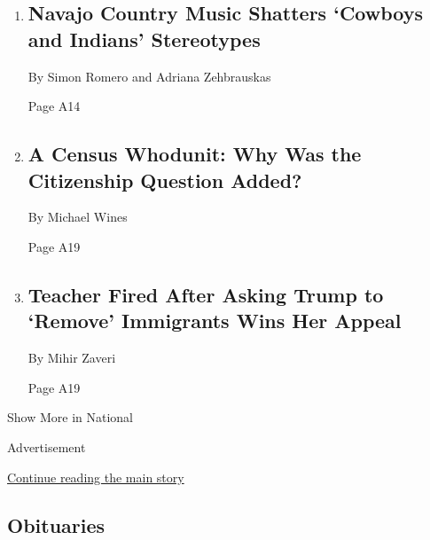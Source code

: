 \begin{enumerate}
\def\labelenumi{\arabic{enumi}.}
\item
  \href{/2019/11/30/us/navajo-country-music.html}{}

  \hypertarget{navajo-country-music-shatters-cowboys-and-indians-stereotypes-1}{%
  \subsection{Navajo Country Music Shatters `Cowboys and Indians'
  Stereotypes}\label{navajo-country-music-shatters-cowboys-and-indians-stereotypes-1}}

  By Simon Romero and Adriana Zehbrauskas

  Page A14
\item
  \href{/2019/11/30/us/census-citizenship-question-hofeller.html}{}

  \hypertarget{a-census-whodunit-why-was-the-citizenship-question-added}{%
  \subsection{A Census Whodunit: Why Was the Citizenship Question
  Added?}\label{a-census-whodunit-why-was-the-citizenship-question-added}}

  By Michael Wines

  Page A19
\item
  \href{/2019/11/29/us/teacher-trump-tweets-reinstated.html}{}

  \hypertarget{teacher-fired-after-asking-trump-to-remove-immigrants-wins-her-appeal}{%
  \subsection{Teacher Fired After Asking Trump to `Remove' Immigrants
  Wins Her
  Appeal}\label{teacher-fired-after-asking-trump-to-remove-immigrants-wins-her-appeal}}

  By Mihir Zaveri

  Page A19
\end{enumerate}

Show More in National

Advertisement

\protect\hyperlink{after-mid2}{Continue reading the main story}

\hypertarget{obituaries}{%
\subsection{Obituaries}\label{obituaries}}

